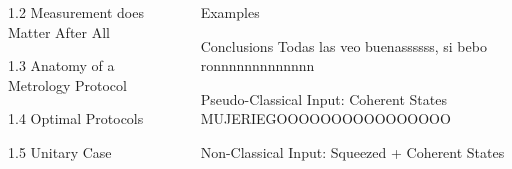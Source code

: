 \documentclass[final]{beamer}
\newlength{\sepwidth}
\newlength{\colwidth}
\newcommand{\separatorcolumn}{\begin{column}{\sepwidth}\end{column}}
\begin{document}
\begin{frame}[t]
\begin{columns}[t]
\begin{column}{\colwidth}
\begin{block}{1.2 Measurement does Matter After All}
  \end{block}

 \begin{block}{1.3 Anatomy of a Metrology Protocol}
   
 \end{block}

\begin{block}{1.4 Optimal Protocols}

\end{block}
\begin{block}{1.5 Unitary Case}

\end{block}


\end{column}

\separatorcolumn

\begin{column}{\colwidth}


\begin{block}{Examples}



\end{block}

   \begin{block}{Conclusions}
     Todas las veo buenassssss, si bebo ronnnnnnnnnnnnn
  \end{block}


  \begin{exampleblock}{Pseudo-Classical Input: Coherent States}
MUJERIEGOOOOOOOOOOOOOOOO

  \end{exampleblock}


  \begin{exampleblock}{Non-Classical Input: Squeezed + Coherent States}


\end{exampleblock}
\end{column}
\end{columns}
\end{frame}
\end{document}

